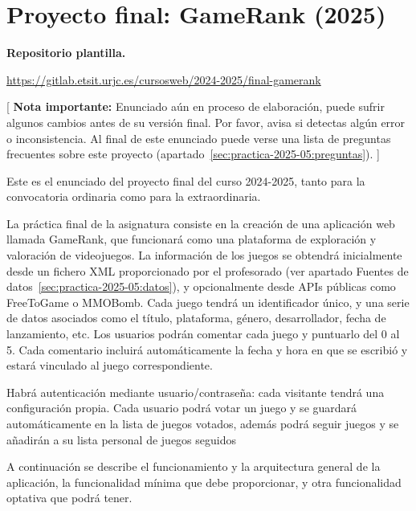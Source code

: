 \section{Proyecto final: GameRank (2025)}
\label{practica-final-2025-05}

\textbf{Repositorio plantilla.}

\url{https://gitlab.etsit.urjc.es/cursosweb/2024-2025/final-gamerank}

[ \textbf{Nota importante:} Enunciado aún en proceso de elaboración, puede sufrir algunos cambios antes de su versión final. Por favor, avisa si detectas algún error o inconsistencia. Al final de este enunciado puede verse una lista de preguntas frecuentes sobre este proyecto (apartado~\ref{sec:practica-2025-05:preguntas}). ]


Este es el enunciado del proyecto final del curso 2024-2025, tanto para la convocatoria ordinaria como para la extraordinaria.

La práctica final de la asignatura consiste en la creación de una aplicación web llamada GameRank, que funcionará como una plataforma de exploración y valoración de videojuegos. La información de los juegos se obtendrá inicialmente desde un fichero XML proporcionado por el profesorado (ver apartado Fuentes de datos~\ref{sec:practica-2025-05:datos}), y opcionalmente desde APIs públicas como FreeToGame o MMOBomb. Cada juego tendrá un identificador único, y una serie de datos asociados como el título, plataforma, género, desarrollador, fecha de lanzamiento, etc. Los usuarios podrán comentar cada juego y puntuarlo del 0 al 5. Cada comentario incluirá automáticamente la fecha y hora en que se escribió y estará vinculado al juego correspondiente.

Habrá autenticación mediante usuario/contraseña: cada visitante tendrá una configuración propia. Cada usuario podrá votar un juego y se guardará automáticamente en la lista de juegos votados, además podrá seguir juegos y se añadirán a su lista personal de juegos seguidos

A continuación se describe el funcionamiento y la arquitectura general de la aplicación, la funcionalidad mínima que debe proporcionar, y otra funcionalidad optativa que podrá tener.

